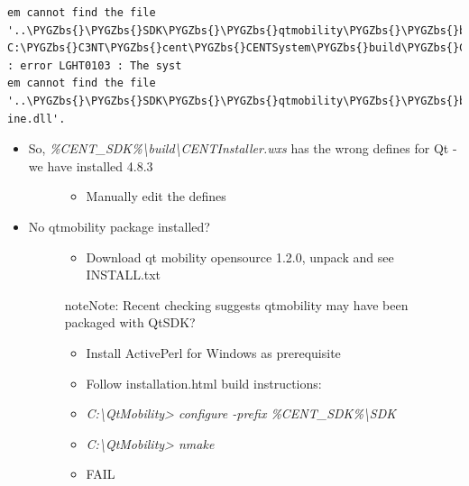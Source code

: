 \documentclass[letterpaper,10pt,english]{sphinxmanual}
\def\PYGZbs{\char`\\}
\begin{document}
\begin{enumerate}
\begin{description}
\begin{Verbatim}[commandchars=\\\{\}]
em cannot find the file '..\PYGZbs{}\PYGZbs{}SDK\PYGZbs{}\PYGZbs{}qtmobility\PYGZbs{}\PYGZbs{}bin\PYGZbs{}\PYGZbs{}mediaservice\PYGZbs{}dsengine.dll'.
C:\PYGZbs{}C3NT\PYGZbs{}cent\PYGZbs{}CENTSystem\PYGZbs{}build\PYGZbs{}CENTInstaller.wxs(144) : error LGHT0103 : The syst
em cannot find the file '..\PYGZbs{}\PYGZbs{}SDK\PYGZbs{}\PYGZbs{}qtmobility\PYGZbs{}\PYGZbs{}bin\PYGZbs{}\PYGZbs{}mediaservice\PYGZbs{}qtmedia\_audioeng
ine.dll'.
\end{Verbatim}
\begin{itemize}
\item {} \begin{description}
\item[{So, \emph{\%CENT\_SDK\%\textbackslash{}build\textbackslash{}CENTInstaller.wxs} has the wrong defines for Qt - we have installed 4.8.3}] \leavevmode\begin{itemize}
\item {} 
Manually edit the defines

\end{itemize}

\end{description}

\item {} \begin{description}
\item[{No qtmobility package installed?}] \leavevmode\begin{itemize}
\item {} 
Download qt mobility opensource 1.2.0, unpack and see INSTALL.txt

\end{itemize}

\begin{notice}{note}{Note:}
Recent checking suggests qtmobility may have been packaged with QtSDK?
\end{notice}
\begin{itemize}
\item {} 
Install ActivePerl for Windows as prerequisite

\item {} 
Follow installation.html build instructions:

\item {} 
\emph{C:\textbackslash{}QtMobility\textgreater{} configure -prefix \%CENT\_SDK\%\textbackslash{}SDK}

\item {} 
\emph{C:\textbackslash{}QtMobility\textgreater{} nmake}

\item {} 
FAIL


\end{itemize}
\end{description}
\end{itemize}
\end{description}
\end{enumerate}
\end{document}
